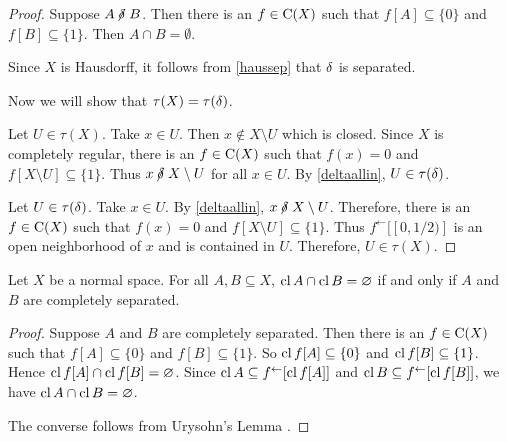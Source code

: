\begin{proof}
	 Suppose \( A \nnear B \).  Then there is an \( f \in \operatorname{C}(X) \) such that \( f[A] \subseteq \{0\} \) and \( f[B] \subseteq \{1\} \).  Then \( A \cap B = \emptyset \).
	
	 Since \( X \) is Hausdorff, it follows from \ref{haussep} that \( \mathbin{\delta} \) is separated.
	
	Now we will show that \( \tau(X) = \tau(\mathord{\delta}) \).
	
	Let \( U \in \tau(X) \).  Take \( x \in U \).  Then \( x \not\in X \setminus U \) which is closed.  Since \( X \) is completely regular, there is an \( f \in \operatorname{C}(X) \) such that \( f(x) = 0 \) and \( f[X \setminus U] \subseteq \{1\} \).  Thus \( x \nnear X \setminus U \) for all \( x \in U \).  By \ref{deltaallin}, \( U \in \tau(\mathord{\delta}) \).
	
	Let \( U \in \tau(\mathord{\delta}) \).  Take \( x \in U \).  By \ref{deltaallin}, \( x \nnear X \setminus U \).  Therefore, there is an \( f \in \operatorname{C}(X) \) such that \( f(x) = 0 \) and \( f[X \setminus U] \subseteq \{ 1 \} \).  Thus \( f^\leftarrow[[0,1/2)] \) is an open neighborhood of \( x \) and is contained in \( U \).  Therefore, \( U \in \tau(X) \).
\end{proof}

\begin{proposition}
	\label{normalcs}
	Let \( X \) be a normal space.  For all \( A,B \subseteq X \), \( \operatorname{cl}{A} \cap \operatorname{cl}{B} = \varnothing \) if and only if \( A \) and \( B \) are completely separated.
\end{proposition}
\begin{proof}
	Suppose \( A \) and \( B \) are completely separated.  Then there is an \( f \in \operatorname{C}(X) \) such that \( f[A] \subseteq \{0\} \) and \( f[B] \subseteq \{1\} \).  So \( \operatorname{cl}{f[A]} \subseteq \{0\} \) and \( \operatorname{cl}{f[B]} \subseteq \{1\} \).  Hence \( \operatorname{cl}{f[A]} \cap \operatorname{cl}{f[B]} = \varnothing \).  Since \( \operatorname{cl}{A} \subseteq f^\leftarrow[\operatorname{cl}{f[A]}] \) and \( \operatorname{cl}{B} \subseteq f^\leftarrow[\operatorname{cl}{f[B]}] \), we have \( \operatorname{cl}{A} \cap \operatorname{cl}{B} = \varnothing \).
	
	The converse follows from Urysohn's Lemma \cite{urysohn}.
\end{proof}

